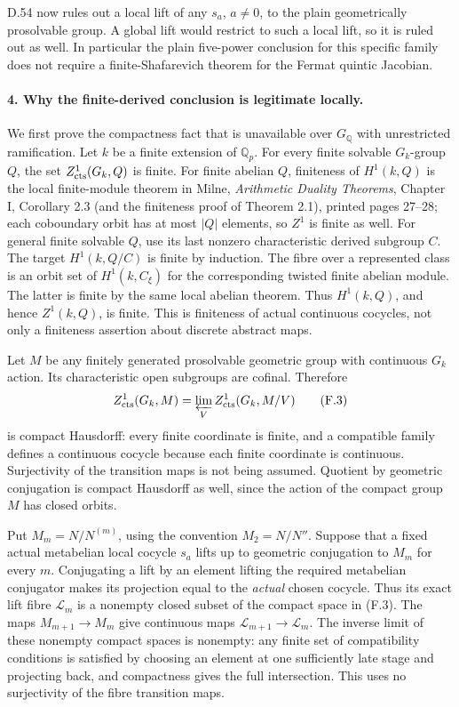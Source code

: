 D.54 now rules out a local lift of any $s_a$, $a\ne0$, to the
plain geometrically prosolvable group.  A global lift would
restrict to such a local lift, so it is ruled out as well.
In particular the plain five-power conclusion for this
specific family does not require a finite-Shafarevich theorem
for the Fermat quintic Jacobian.

\paragraph{4. Why the finite-derived conclusion is legitimate locally.}

We first prove the compactness fact that is unavailable over
$G_{\mathbb Q}$ with unrestricted ramification.  Let $k$ be a
finite extension of $\mathbb Q_p$.  For every finite solvable
$G_k$-group $Q$, the set $Z^1_{\rm cts}(G_k,Q)$ is finite.
For finite abelian $Q$, finiteness of $H^1(k,Q)$ is the local
finite-module theorem in Milne, \emph{Arithmetic Duality
Theorems}, Chapter I, Corollary 2.3 (and the finiteness proof
of Theorem 2.1), printed pages 27--28; each coboundary orbit has at
most $|Q|$ elements, so $Z^1$ is finite as well.  For general
finite solvable $Q$, use its last nonzero characteristic
derived subgroup $C$.  The target $H^1(k,Q/C)$ is finite by
induction.  The fibre over a represented class is an orbit
set of $H^1(k,C_\xi)$ for the corresponding twisted finite
abelian module.  The latter is finite by the same local
abelian theorem.  Thus $H^1(k,Q)$, and hence $Z^1(k,Q)$, is
finite.  This is finiteness of actual continuous cocycles,
not only a finiteness assertion about discrete abstract maps.

Let $M$ be any finitely generated prosolvable geometric group
with continuous $G_k$ action.  Its characteristic open
subgroups are cofinal.  Therefore
\[
 Z^1_{\rm cts}(G_k,M)
       =\varprojlim_V Z^1_{\rm cts}(G_k,M/V)             \tag{F.3}
\]
is compact Hausdorff: every finite coordinate is finite, and
a compatible family defines a continuous cocycle because
each finite coordinate is continuous.  Surjectivity of the
transition maps is not being assumed.  Quotient by geometric
conjugation is compact Hausdorff as well, since the action of
the compact group $M$ has closed orbits.

Put $M_m=N/N^{(m)}$, using the convention $M_2=N/N''$.
Suppose that a fixed actual metabelian local cocycle $s_a$
lifts up to geometric conjugation to $M_m$ for every $m$.
Conjugating a lift by an element lifting the required
metabelian conjugator makes its projection equal to the
\emph{actual} chosen cocycle.  Thus its exact lift fibre
$\mathcal L_m$ is a nonempty closed subset of the compact
space in (F.3).  The maps $M_{m+1}\to M_m$ give continuous
maps $\mathcal L_{m+1}\to\mathcal L_m$.  The inverse limit
of these nonempty compact spaces is nonempty: any finite
set of compatibility conditions is satisfied by choosing
an element at one sufficiently late stage and projecting
back, and compactness gives the full intersection.  This
uses no surjectivity of the fibre transition maps.

